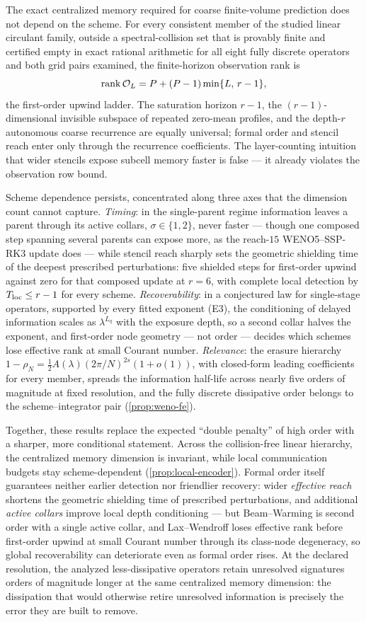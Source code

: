 \documentclass[pdflatex,sn-mathphys-num]{sn-jnl}%
\theoremstyle{thmstyleone}%
\theoremstyle{thmstyletwo}%
\theoremstyle{thmstylethree}%
\DeclareMathOperator{\rank}{rank}
\newcommand{\OL}{{\cal O}_L}
\begin{document}
The exact centralized memory required for coarse finite-volume prediction does not depend on the scheme.
For every consistent member of the studied linear circulant family, outside a spectral-collision set that is provably finite and certified empty in exact rational arithmetic for all eight fully discrete operators and both grid pairs examined, the finite-horizon observation rank is \[ \rank\OL=P+(P-1)\min\{L,\,r-1\}, \] the first-order upwind ladder.
The saturation horizon $r-1$, the $(r-1)$-dimensional invisible subspace of repeated zero-mean profiles, and the depth-$r$ autonomous coarse recurrence are equally universal; formal order and stencil reach enter only through the recurrence coefficients.
The layer-counting intuition that wider stencils expose subcell memory faster is false --- it already violates the observation row bound.

Scheme dependence persists, concentrated along three axes that the dimension count cannot capture.
\emph{Timing}: in the single-parent regime information leaves a parent through its active collars, $\sigma\in\{1,2\}$, never faster --- though one composed step spanning several parents can expose more, as the reach-$15$ WENO5--SSP-RK3 update does --- while stencil reach sharply sets the geometric shielding time of the deepest prescribed perturbations: five shielded steps for first-order upwind against zero for that composed update at $r=6$, with complete local detection by $T_{\rm loc}\le r-1$ for every scheme.
\emph{Recoverability}: in a conjectured law for single-stage operators, supported by every fitted exponent (E3), the conditioning of delayed information scales as $\lambda^{L_q}$ with the exposure depth, so a second collar halves the exponent, and first-order node geometry --- not order --- decides which schemes lose effective rank at small Courant number.
\emph{Relevance}: the erasure hierarchy $1-\rho_N=\tfrac12A(\lambda)(2\pi/N)^{2s}(1+o(1))$, with closed-form leading coefficients for every member, spreads the information half-life across nearly five orders of magnitude at fixed resolution, and the fully discrete dissipative order belongs to the scheme--integrator pair (\cref{prop:weno-fe}).

Together, these results replace the expected \enquote{double penalty} of high order with a sharper, more conditional statement.
Across the collision-free linear hierarchy, the centralized memory dimension is invariant, while local communication budgets stay scheme-dependent (\cref{prop:local-encoder}).
Formal order itself guarantees neither earlier detection nor friendlier recovery: wider \emph{effective reach} shortens the geometric shielding time of prescribed perturbations, and additional \emph{active collars} improve local depth conditioning --- but Beam--Warming is second order with a single active collar, and Lax--Wendroff loses effective rank before first-order upwind at small Courant number through its class-node degeneracy, so global recoverability can deteriorate even as formal order rises.
At the declared resolution, the analyzed less-dissipative operators retain unresolved signatures orders of magnitude longer at the same centralized memory dimension: the dissipation that would otherwise retire unresolved information is precisely the error they are built to remove.
\end{document}
